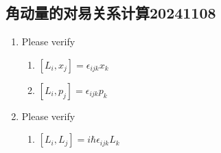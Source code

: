 \documentclass{article}
\begin{document}
\subsection{角动量的对易关系计算20241108}
\begin{enumerate}
    \item Please verify
    \begin{enumerate}
        \item $[L_i,x_j]=\epsilon_{ijk}x_k$
        \item $[L_i,p_j]=\epsilon_{ijk}p_k$
    \end{enumerate}
    \item Please verify
    \begin{enumerate}
        \item $[L_i,L_j]=i\hbar\epsilon_{ijk} L_k$
    \end{enumerate}
\end{enumerate}
\end{document}
